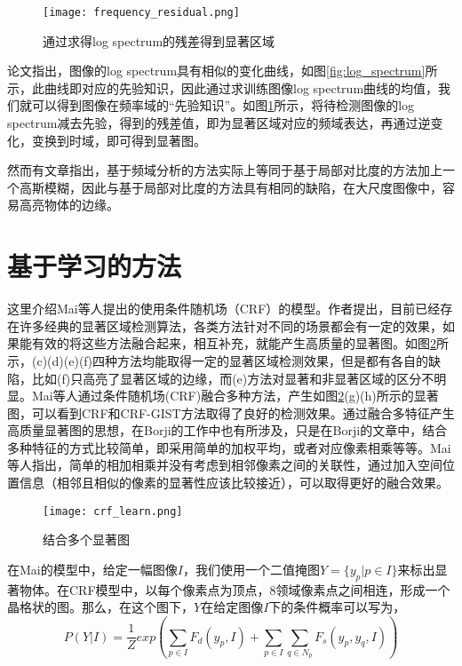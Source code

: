 \begin{figure}[t]
\centering
\texttt{[image: frequency\_residual.png]}
\caption{通过求得log spectrum的残差得到显著区域}\label{fig:frequency_residual}
\end{figure}

论文指出，图像的log spectrum具有相似的变化曲线，如图\ref{fig:log_spectrum}所示，此曲线即对应的先验知识，因此通过求训练图像log spectrum曲线的均值，我们就可以得到图像在频率域的“先验知识”。如图\ref{fig:frequency_residual}所示，将待检测图像的log spectrum减去先验，得到的残差值，即为显著区域对应的频域表达，再通过逆变化，变换到时域，即可得到显著图。

然而有文章\cite{hou2012image}指出，基于频域分析的方法实际上等同于基于局部对比度的方法加上一个高斯模糊，因此与基于局部对比度的方法具有相同的缺陷，在大尺度图像中，容易高亮物体的边缘。

\section{基于学习的方法}
这里介绍Mai等人\cite{maisaliency}提出的使用条件随机场（CRF）的模型。作者提出，目前已经存在许多经典的显著区域检测算法，各类方法针对不同的场景都会有一定的效果，如果能有效的将这些方法融合起来，相互补充，就能产生高质量的显著图。如图\ref{fig:crf_learn}所示，(c)(d)(e)(f)四种方法均能取得一定的显著区域检测效果，但是都有各自的缺陷，比如(f)只高亮了显著区域的边缘，而(e)方法对显著和非显著区域的区分不明显。Mai等人通过条件随机场(CRF)融合多种方法，产生如图\ref{fig:crf_learn}(g)(h)所示的显著图，可以看到CRF和CRF-GIST方法取得了良好的检测效果。通过融合多特征产生高质量显著图的思想，在Borji的工作中\cite{borji2012salient}也有所涉及，只是在Borji的文章中，结合多种特征的方式比较简单，即采用简单的加权平均，或者对应像素相乘等等。Mai等人指出\cite{maisaliency}，简单的相加相乘并没有考虑到相邻像素之间的关联性，通过加入空间位置信息（相邻且相似的像素的显著性应该比较接近），可以取得更好的融合效果。

\begin{figure}[h]
\centering
\texttt{[image: crf\_learn.png]}
\caption{结合多个显著图}\label{fig:crf_learn}
\end{figure}

在Mai的模型中，给定一幅图像$I$，我们使用一个二值掩图$Y=\{y_p|p\in I\}$来标出显著物体。在CRF模型中，以每个像素点为顶点，8领域像素点之间相连，形成一个晶格状的图。那么，在这个图下，$Y$在给定图像$I$下的条件概率可以写为，
\begin{equation}
P(Y|I) = \frac{1}{Z}exp(\sum_{p\in I}F_d(y_p, I) + \sum_{p\in I}\sum_{q\in N_p}F_s(y_p,y_q,I) )
\end{equation}

